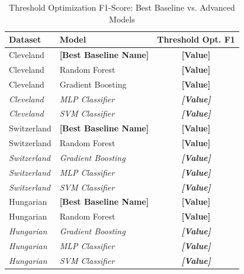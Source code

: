 \documentclass{article}
\begin{document}
\begin{table}[htbp]
\centering
\caption{Threshold Optimization F1-Score: Best Baseline vs. Advanced Models}
\label{tab:advanced_comparison_thresh_opt}
\begin{tabular}{llc}
\toprule
Dataset     & Model                & Threshold Opt. F1 \\
\midrule
Cleveland   & \textbf{[Best Baseline Name]} & \textbf{[Value]}    \\
Cleveland   & Random Forest        & \textbf{[Value]}    \\
Cleveland   & Gradient Boosting    & \textbf{[Value]}    \\
\textit{Cleveland} & \textit{MLP Classifier} & \textit{\textbf{[Value]}}    \\
\textit{Cleveland} & \textit{SVM Classifier} & \textit{\textbf{[Value]}}    \\
\midrule
Switzerland & \textbf{[Best Baseline Name]} & \textbf{[Value]}    \\
Switzerland & Random Forest        & \textbf{[Value]}    \\
\textit{Switzerland} & \textit{Gradient Boosting} & \textit{\textbf{[Value]}}    \\
\textit{Switzerland} & \textit{MLP Classifier} & \textit{\textbf{[Value]}}    \\
\textit{Switzerland} & \textit{SVM Classifier} & \textit{\textbf{[Value]}}    \\
\midrule
Hungarian   & \textbf{[Best Baseline Name]} & \textbf{[Value]}    \\
Hungarian   & Random Forest        & \textbf{[Value]}    \\
\textit{Hungarian} & \textit{Gradient Boosting} & \textit{\textbf{[Value]}}    \\
\textit{Hungarian} & \textit{MLP Classifier} & \textit{\textbf{[Value]}}    \\
\textit{Hungarian} & \textit{SVM Classifier} & \textit{\textbf{[Value]}}    \\
\bottomrule
\end{tabular}
\end{table}
\end{document}
